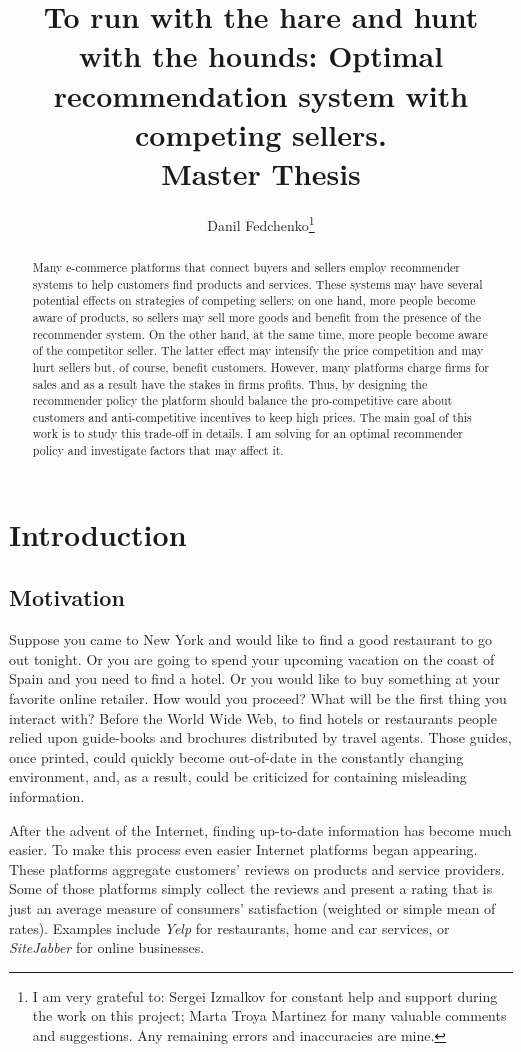 \documentclass[a4paper]{article}
\title{To run with the hare and hunt with the hounds: Optimal recommendation system with competing sellers. \\ Master Thesis}
\date{}
\author{Danil Fedchenko\thanks{I am very grateful to: Sergei Izmalkov for constant help and support during the work on this project; Marta Troya Martinez for many valuable comments and suggestions. \newline Any remaining errors and inaccuracies are mine.}}
\begin{document}
 
	
	\maketitle
	\begin{abstract}
		Many e-commerce platforms that connect buyers and sellers employ recommender systems to help customers find products and services. These systems may have several potential effects on strategies of competing sellers: on one hand, more people become aware of products, so sellers may sell more goods and benefit from the presence of the recommender system. On the other hand, at the same time, more people become aware of the competitor seller. The latter effect may intensify the price competition and may hurt sellers but, of course, benefit customers. However, many platforms charge firms for sales and as a result have the stakes in firms profits. Thus, by designing the recommender policy the platform should balance the pro-competitive care about customers and anti-competitive incentives to keep high prices. The main goal of this work is to study this trade-off in details. I am solving for an optimal recommender policy and investigate factors that may affect it.
	\end{abstract}
\newpage
\tableofcontents
\newpage
	\section{Introduction}
	
	\subsection{Motivation}
	
		Suppose you came to New York and would like to find a good restaurant to go out tonight. Or you are going to spend your upcoming vacation on the coast of Spain and you need to find a hotel. Or you would like to buy something at your favorite online retailer. How would you proceed? What will be the first thing you interact with?  Before the World Wide Web, to find hotels or restaurants people relied upon guide-books and brochures distributed by travel agents. Those guides, once printed, could quickly become out-of-date in the constantly changing environment, and, as a result, could be criticized for containing misleading information. 
	
	
	
	
	
	After the advent of the Internet, finding up-to-date information has become much easier. To make this process even easier Internet platforms began appearing. These platforms aggregate customers' reviews on products and service providers. Some of those platforms simply collect the reviews and present a rating that is just an average measure of consumers' satisfaction (weighted or simple mean of rates). Examples include \textit{Yelp} for restaurants, home and car services, or \textit{SiteJabber} for online businesses.
	
\end{document}
